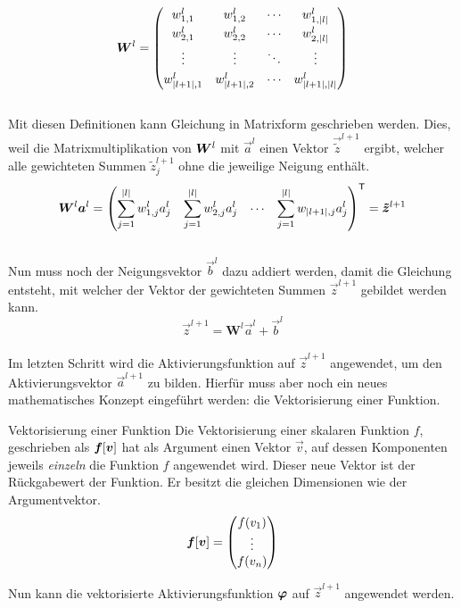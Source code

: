 \begin{equation*}
  \bm{W}^l =
  \begin{pmatrix}
    w_{1,1}^l & w_{1,2}^l & \cdots & w_{1,|l|}^l \\[0.3em]
    w_{2,1}^l & w_{2,2}^l & \cdots & w_{2,|l|}^l \\[0.3em]
    \vdots & \vdots & \ddots & \vdots \\[0.3em]
    w_{|l+1|,1}^l & w_{|l+1|,2}^l & \cdots & w_{|l+1|,|l|}^l
  \end{pmatrix}
\end{equation*}
\\
Mit diesen Definitionen kann Gleichung  in
Matrixform geschrieben werden. Dies, weil die Matrixmultiplikation von $\bm{W}^l$ mit
$\vec{a}^{l}$ einen Vektor $\vec{\tilde{z}}^{l+1}$ ergibt, welcher alle gewichteten
Summen $\tilde{z}_j^{l+1}$ ohne die jeweilige Neigung enthält.
\\
\begin{equation*}
  \bm{W}^l \bm{a}^{l} = \begin{pmatrix}\displaystyle \sum_{j=1}^{|l|} w_{1,j}^l a_j^l &\displaystyle \sum_{j=1}^{|l|} w_{2,j}^l a_j^l & \cdots &\displaystyle \sum_{j=1}^{|l|} w_{|l+1|,j} a_j^l \end{pmatrix}^{\mathsf{T}} = \bm{\tilde{z}}^{l+1}
\end{equation*}
\\
Nun muss noch der Neigungsvektor $\vec{b}^l$ dazu addiert werden, damit die
Gleichung  entsteht, mit welcher der
Vektor der gewichteten Summen $\vec{z}^{l+1}$ gebildet werden kann.
\\
\begin{equation}\tag{FP1a}\label{eq:gewichtete_summe_matrix}
  \vec{z}^{l+1} = \mathbf{W}^{l} \vec{a}^{l} + \vec{b}^{l}
\end{equation}
\\
Im letzten Schritt wird die Aktivierungsfunktion auf $\vec{z}^{l+1}$
angewendet, um den Aktivierungsvektor $\vec{a}^{l+1}$ zu bilden.
Hierfür muss aber noch ein neues mathematisches
Konzept eingeführt werden: die Vektorisierung einer Funktion.
\para{}

\begin{defbox}{Vektorisierung einer Funktion}
  Die Vektorisierung einer skalaren Funktion $f$, geschrieben als
  $\bm{f}[\bm{v}]$ hat als Argument einen Vektor $\vec{v}$, auf dessen
  Komponenten jeweils \textit{einzeln} die Funktion $f$ angewendet wird. Dieser neue
  Vektor ist der Rückgabewert der Funktion. Er besitzt die gleichen Dimensionen
  wie der Argumentvektor.
  \\
  \begin{equation*}
    \bm{f}[\bm{v}]=
    \begin{pmatrix}
      f(v_1)\\
      \vdots \\
      f(v_n)\\
    \end{pmatrix}
  \end{equation*}
\end{defbox}
\para{}
Nun kann die vektorisierte Aktivierungsfunktion $\bm{\varphi}$ auf
$\vec{z}^{l+1}$ angewendet werden.

